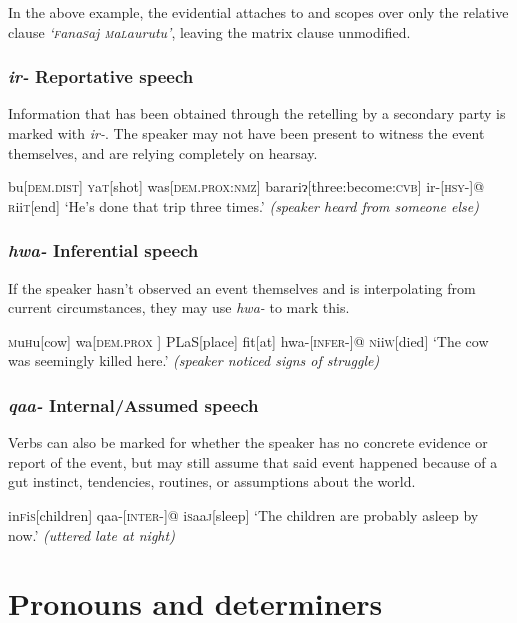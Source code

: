\documentclass[a4paper,10pt,twoside,openright]{memoir}
\newcommand{\lilglot}{ɂ}
\newcommand{\famwordold}[5]{#1\textsc{#2}#3\textsc{#4}#5}
\begin{document}
In the above example, the evidential attaches to and scopes over only the relative clause \emph{`\famwordold{}{f}{ana}{s}{aj} \famwordold{}{m}{a}{l}{aurutu}'}, leaving the matrix clause unmodified. 

\subsubsection{\emph{ir-} Reportative speech}

Information that has been obtained through the retelling by a secondary party is marked with \emph{ir-}. The speaker may not have been present to witness the event themselves, and are relying completely on hearsay.

\ex
\begingl
bu[\textsc{dem.dist}]
\famwordold{}{y}{a}{t}{}[shot]
was[\textsc{dem.prox:nmz}]
barari\lilglot[three:become:\textsc{cvb}]
ir-[\textsc{hsy-}]@
\famwordold{}{r}{ii}{t}{}[end]
\glft `He's done that trip three times.' \textit{(speaker heard from someone else)}
\endgl
\xe

\subsubsection{\emph{hwa-} Inferential speech}

If the speaker hasn't observed an event themselves and is interpolating from current circumstances, they may use \emph{hwa-} to mark this. 

\ex
\begingl
\famwordold{}{m}{u}{h}{u}[cow]
wa[\textsc{dem.prox
}]
\famwordold{}{PL}{a}{S}{}[place]
fit[at]
hwa-[\textsc{infer-}]@
\famwordold{}{n}{ii}{w}{}[died]
\glft `The cow was seemingly killed here.' \textit{(speaker noticed signs of struggle)}
\endgl
\xe

\subsubsection{\emph{qaa-} Internal/Assumed speech}

Verbs can also be marked for whether the speaker has no concrete evidence or report of the event, but may still assume that said event happened because of a gut instinct, tendencies, routines, or assumptions about the world.

\ex
\begingl
\famwordold{in}{f}{i}{s}{}[children]
qaa-[\textsc{inter-}]@
\famwordold{i}{s}{aa}{j}{}[sleep]
\glft `The children are probably asleep by now.' \textit{(uttered late at night)}
\endgl
\xe

\newpage
\section{Pronouns and determiners}
\end{document}

